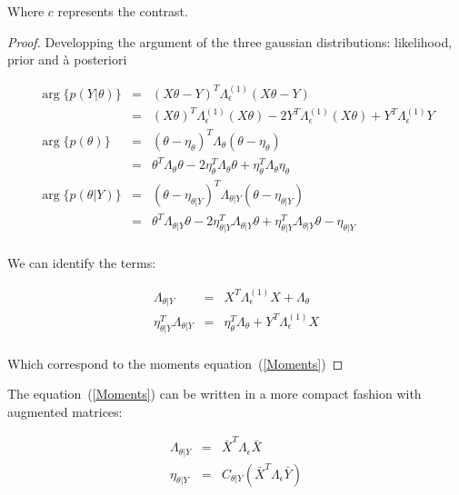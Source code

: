 \documentclass[final, paper=letter,5p,times,twocolumn]{elsarticle}
\theoremstyle{definition}
\begin{document}
Where $c$ represents the contrast.

\begin{proof}
Developping the argument of the three gaussian distributions: likelihood, prior and \`a posteriori
  
\begin{equation*}
  \left .
  \begin{array}{rcl}
    \arg\{p(Y|\theta)\} & = & (X\theta - Y)^{T} \Lambda_{\epsilon}^{(1)} (X\theta - Y)  \\
    & = & (X\theta)^{T} \Lambda_{\epsilon}^{(1)}(X\theta) - 2 Y^{T} \Lambda_{\epsilon}^{(1)}(X\theta) + Y^{T} \Lambda_{\epsilon}^{(1)}Y  \\
    \arg\{p(\theta)\}   & = & (\theta - \eta_{\theta})^{T} \Lambda_{\theta} (\theta - \eta_{\theta}) \\
    & = & \theta^{T} \Lambda_{\theta} \theta - 2 \eta_{\theta}^{T}\Lambda_{\theta}\theta + \eta_{\theta}^{T} \Lambda_{\theta} \eta_{\theta}\\
    \arg\{p(\theta|Y)\} & = & (\theta - \eta_{\theta|Y})^{T} \Lambda_{\theta|Y} (\theta - \eta_{\theta|Y}) \\
    & = & \theta^{T} \Lambda_{\theta|Y}\theta - 2 \eta_{\theta|Y}^{T} \Lambda_{\theta|Y}\theta + \eta_{\theta|Y}^{T} \Lambda_{\theta|Y}\theta - \eta_{\theta|Y}\\
  \end{array}
  \right .
\end{equation*}

We can identify the terms:

\begin{equation*}
  \left .
  \begin{array}{rcl}
    \Lambda_{\theta|Y} & = & X^{T}\Lambda_{\epsilon}^{(1)}X + \Lambda_{\theta}\\
    \eta_{\theta|Y}^{T} \Lambda_{\theta|Y} & = & \eta_{\theta}^{T}\Lambda_{\theta} + Y^{T} \Lambda_{\epsilon}^{(1)}X\\
  \end{array}
  \right .
\end{equation*}

Which correspond to the moments equation~(\ref{Moments})
\end{proof}

The equation~(\ref{Moments}) can be written in a more compact fashion with augmented matrices:

\begin{equation}
  \left .
  \begin{array}{rcl}
    \Lambda_{\theta|Y} & = & \bar{X}^{T}\Lambda_{\epsilon}\bar{X} \\
    \eta_{\theta|Y}    & = & C_{\theta|Y} \left( \bar{X}^{T}\Lambda_{\epsilon}\bar{Y} \right)\\
  \end{array}
  \right .
  \label{Moments_augmented}
\end{equation}
\end{document}
